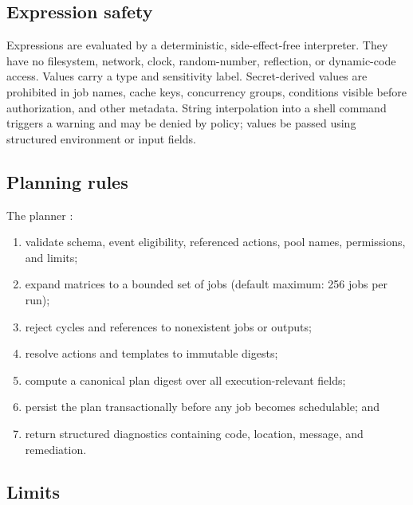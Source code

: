 \subsection{Expression safety}

Expressions are evaluated by a deterministic, side-effect-free interpreter. They have
no filesystem, network, clock, random-number, reflection, or dynamic-code access.
Values carry a type and sensitivity label. Secret-derived values are prohibited in job
names, cache keys, concurrency groups, conditions visible before authorization, and
other metadata. String interpolation into a shell command triggers a warning and may
be denied by policy; values \should be passed using structured environment or input fields.

\subsection{Planning rules}

The planner \must:

\begin{enumerate}
  \item validate schema, event eligibility, referenced actions, pool names, permissions, and limits;
  \item expand matrices to a bounded set of jobs (default maximum: 256 jobs per run);
  \item reject cycles and references to nonexistent jobs or outputs;
  \item resolve actions and templates to immutable digests;
  \item compute a canonical plan digest over all execution-relevant fields;
  \item persist the plan transactionally before any job becomes schedulable; and
  \item return structured diagnostics containing code, location, message, and remediation.
\end{enumerate}

\subsection{Limits}

